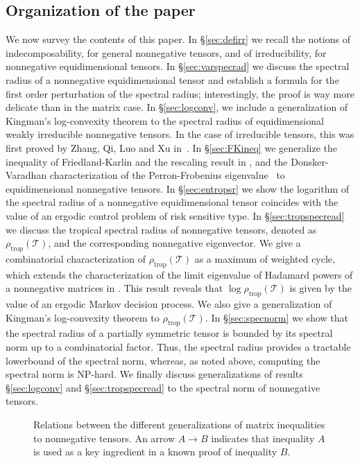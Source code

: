 \documentclass{amsart}
\newcommand{\0}{\mathbf{0}}
\newcommand{\1}{\mathbf{1}}
\newcommand{\cT}{\mathcal{T}}
\newcommand{\trop}{\mathrm{trop}}
\theoremstyle{remark}
\numberwithin{equation}{section} %
\begin{document}
 \subsection{Organization of the paper}
   We now survey the contents of this paper.  In \S\ref{sec:defirr} we recall the notions of indecomposability, for general nonnegative tensors,  and of irreducibility, for    nonnegative equidimensional  tensors. In \S\ref{sec:varspecrad} we discuss the spectral radius of a nonnegative equidimensional tensor and 
establish a formula for the first order
   perturbation of the spectral radius; interestingly, the proof is way more delicate than in the matrix case.  In \S\ref{sec:logconv}, we include
a generalization of Kingman's log-convexity theorem to the spectral radius of equidimensional weakly irreducible nonnegative tensors. In the case of irreducible tensors, this was first proved by Zhang, Qi, Luo and Xu in~\cite{ZQL10}. 
%
%
%
   In \S\ref{sec:FKineq} we generalize the inequality of Friedland-Karlin and the rescaling result in \cite{FK75}, and  the  Donsker-Varadhan characterization of the Perron-Frobenius eigenvalue~\cite{DV75} to equidimensional nonnegative tensors.  In \S\ref{sec:entropsr} we show
the logarithm of the spectral radius of  a nonnegative equidimensional tensor
coincides with the value of an ergodic control problem
of risk sensitive type.
%
%
%
%
%
%
    In \S\ref{sec:tropspecread} we discuss the tropical spectral radius of nonnegative tensors, denoted as $\rho_{\trop}(\cT)$, and the corresponding nonnegative eigenvector.   We give a combinatorial characterization of  $\rho_{\trop}(\cT)$ as a maximum of weighted cycle, which extends the characterization of the limit eigenvalue of Hadamard powers of a nonnegative matrices in \cite{Fri86}. 
This result reveals that $\log \rho_{\trop}(\cT)$ is given by the
value of an ergodic Markov decision process. 
%
%
%
%
%
We also give a generalization of Kingman's log-convexity theorem to $\rho_{\trop}(\cT)$.
   In \S\ref{sec:specnorm} we show that the spectral radius of a partially symmetric tensor is bounded by its spectral norm up to a combinatorial factor.
%
Thus, the spectral radius provides a tractable lowerbound of the spectral norm,
whereas, as noted above, computing the spectral norm is NP-hard.
%
%
%
We finally discuss generalizations of results \S\ref{sec:logconv} and \S\ref{sec:tropspecread} to the spectral norm
   of nonnegative tensors.
 
 
 
\begin{figure}
\begin{figure}[omitted: a diagram of this paper's results, not reproduced here]\end{figure}
\caption{Relations between the different generalizations of matrix inequalities to nonnegative tensors. An arrow $A\to B$ indicates that inequality $A$ is used as a key ingredient in a known proof of inequality $B$.}
\end{figure}
\end{document}
